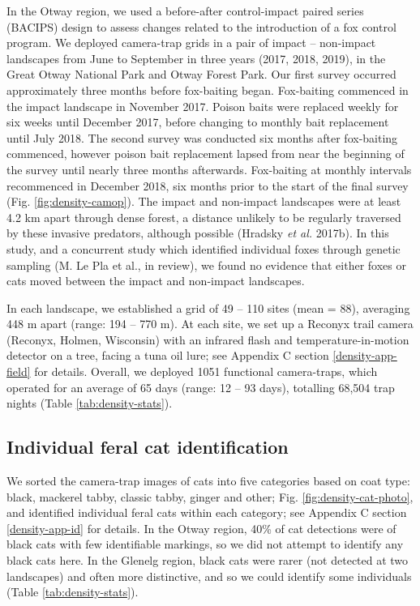 \documentclass[11pt,a4paper,titlepage,twoside,openright]{style/unimelbthesis}
\begin{document}
\begin{mainmatter}
In the Otway region, we used a before-after control-impact paired series (BACIPS) design to assess changes related to the introduction of a fox control program. We deployed camera-trap grids in a pair of impact -- non-impact landscapes from June to September in three years (2017, 2018, 2019), in the Great Otway National Park and Otway Forest Park. Our first survey occurred approximately three months before fox-baiting began. Fox-baiting commenced in the impact landscape in November 2017. Poison baits were replaced weekly for six weeks until December 2017, before changing to monthly bait replacement until July 2018. The second survey was conducted six months after fox-baiting commenced, however poison bait replacement lapsed from near the beginning of the survey until nearly three months afterwards. Fox-baiting at monthly intervals recommenced in December 2018, six months prior to the start of the final survey (Fig. \ref{fig:density-camop}). The impact and non-impact landscapes were at least 4.2 km apart through dense forest, a distance unlikely to be regularly traversed by these invasive predators, although possible (Hradsky \emph{et al.} 2017b). In this study, and a concurrent study which identified individual foxes through genetic sampling (M. Le Pla et al., in review), we found no evidence that either foxes or cats moved between the impact and non-impact landscapes.

In each landscape, we established a grid of 49 -- 110 sites (mean = 88), averaging 448 m apart (range: 194 -- 770 m). At each site, we set up a Reconyx trail camera (Reconyx, Holmen, Wisconsin) with an infrared flash and temperature-in-motion detector on a tree, facing a tuna oil lure; see Appendix C section \ref{density-app-field} for details. Overall, we deployed 1051 functional camera-traps, which operated for an average of 65 days (range: 12 -- 93 days), totalling 68,504 trap nights (Table \ref{tab:density-stats}).

\hypertarget{individual-feral-cat-identification}{%
\subsection{Individual feral cat identification}\label{individual-feral-cat-identification}}

We sorted the camera-trap images of cats into five categories based on coat type: black, mackerel tabby, classic tabby, ginger and other; Fig. \ref{fig:density-cat-photo}, and identified individual feral cats within each category; see Appendix C section \ref{density-app-id} for details. In the Otway region, 40\% of cat detections were of black cats with few identifiable markings, so we did not attempt to identify any black cats here. In the Glenelg region, black cats were rarer (not detected at two landscapes) and often more distinctive, and so we could identify some individuals (Table \ref{tab:density-stats}).


\end{mainmatter}
\end{document}
